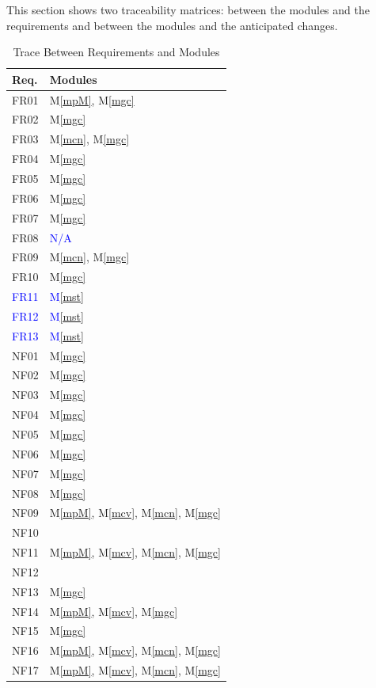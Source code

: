 \documentclass[12pt, titlepage]{article}
\newcommand{\mref}[1]{M\ref{#1}}
\begin{document}
This section shows two traceability matrices: between the modules and the
requirements and between the modules and the anticipated changes.

\begin{table}[H]
\centering
\begin{tabular}{p{} p{}}
\toprule
\textbf{Req.} & \textbf{Modules}\\
\midrule
FR01 & \mref{mpM}, \mref{mgc} \\ %
FR02 & \mref{mgc}\\
FR03 & \mref{mcn}, \mref{mgc} \\
FR04 & \mref{mgc}\\
FR05 & \mref{mgc}\\
FR06 & \mref{mgc} \\
FR07 & \mref{mgc}\\
FR08 & \textcolor{blue}{N/A}\\
FR09 & \mref{mcn}, \mref{mgc}\\
FR10 & \mref{mgc}\\
\textcolor{blue}{FR11} & \textcolor{blue}{\mref{mst}}\\
\textcolor{blue}{FR12} & \textcolor{blue}{\mref{mst}}\\
\textcolor{blue}{FR13} & \textcolor{blue}{\mref{mst}}\\
NF01 & \mref{mgc}\\
NF02 & \mref{mgc}\\
NF03 & \mref{mgc}\\
NF04 & \mref{mgc}\\
NF05 & \mref{mgc}\\
NF06 & \mref{mgc} \\
NF07 & \mref{mgc}\\
NF08 & \mref{mgc} \\
NF09 & \mref{mpM}, \mref{mcv}, \mref{mcn}, \mref{mgc} \\
NF10 & \\
NF11 & \mref{mpM}, \mref{mcv}, \mref{mcn}, \mref{mgc} \\
NF12 & \\
NF13 & \mref{mgc}\\
NF14 & \mref{mpM}, \mref{mcv}, \mref{mgc} \\
NF15 & \mref{mgc}\\
NF16 & \mref{mpM}, \mref{mcv}, \mref{mcn}, \mref{mgc} \\
NF17 & \mref{mpM}, \mref{mcv}, \mref{mcn}, \mref{mgc} \\
\bottomrule
\end{tabular}
\caption{Trace Between Requirements and Modules}
\label{TblRT}
\end{table}
\end{document}
